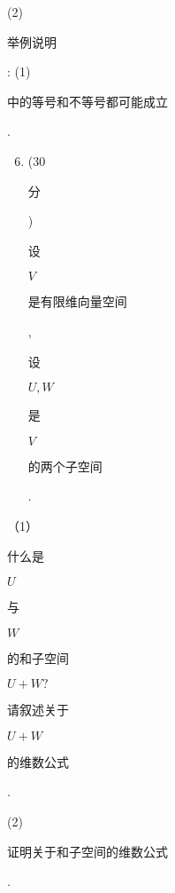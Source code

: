 \documentclass[10pt]{article}
\begin{document}
(2) \begin{CJK}{UTF8}{mj}举例说明\end{CJK}: (1) \begin{CJK}{UTF8}{mj}中的等号和不等号都可能成立\end{CJK}.

\begin{enumerate}
  \setcounter{enumi}{5}
  \item (30 \begin{CJK}{UTF8}{mj}分\end{CJK}) \begin{CJK}{UTF8}{mj}设\end{CJK} $V$ \begin{CJK}{UTF8}{mj}是有限维向量空间\end{CJK}, \begin{CJK}{UTF8}{mj}设\end{CJK} $U, W$ \begin{CJK}{UTF8}{mj}是\end{CJK} $V$ \begin{CJK}{UTF8}{mj}的两个子空间\end{CJK}.
\end{enumerate}
（1）\begin{CJK}{UTF8}{mj}什么是\end{CJK} $U$ \begin{CJK}{UTF8}{mj}与\end{CJK} $W$ \begin{CJK}{UTF8}{mj}的和子空间\end{CJK} $U+W ?$ \begin{CJK}{UTF8}{mj}请叙述关于\end{CJK} $U+W$ \begin{CJK}{UTF8}{mj}的维数公式\end{CJK}.

(2) \begin{CJK}{UTF8}{mj}证明关于和子空间的维数公式\end{CJK}.
\end{document}
